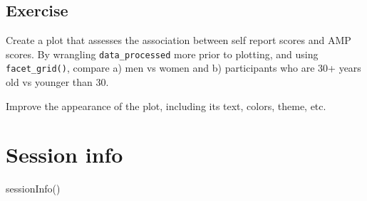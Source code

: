\documentclass[
  letterpaper,
  DIV=11,
  numbers=noendperiod]{scrreprt}
\newenvironment{Shaded}{\begin{snugshade}}{\end{snugshade}}
\newcommand{\FunctionTok}[1]{\textcolor[rgb]{0.28,0.35,0.67}{#1}}
\newcommand{\NormalTok}[1]{\textcolor[rgb]{0.00,0.23,0.31}{#1}}
\begin{document}
\section{Exercise}\label{exercise}

Create a plot that assesses the association between self report scores
and AMP scores. By wrangling \texttt{data\_processed} more prior to
plotting, and using \texttt{facet\_grid()}, compare a) men vs women and
b) participants who are 30+ years old vs younger than 30.

Improve the appearance of the plot, including its text, colors, theme,
etc.


\chapter{Session info}\label{session-info}

\begin{Shaded}
\begin{Highlighting}[]
\FunctionTok{sessionInfo}\NormalTok{()}
\end{Highlighting}
\end{Shaded}
\end{document}
